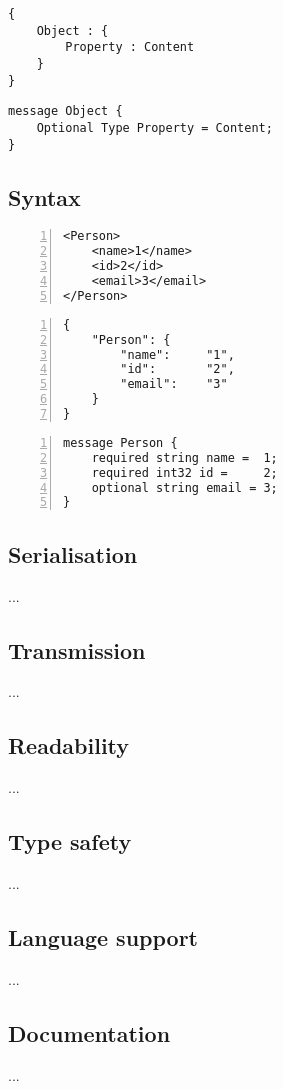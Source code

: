 \documentclass[../report.tex]{subfiles}
\begin{document}
\vspace{1mm}

\begin{Verbatim}[frame=single,numbers=right,framesep=5mm,label=JSON Object]
{
    Object : {
        Property : Content
    }
}
\end{Verbatim}

\vspace{1mm}

\begin{Verbatim}[frame=single,numbers=right,framesep=5mm,label=Proto Object]
message Object {
    Optional Type Property = Content;
}
\end{Verbatim}

\subsection{Syntax}

\begin{Verbatim}[frame=single,numbers=left,framesep=5mm,label=XML Object]
<Person>
    <name>1</name>
    <id>2</id>
    <email>3</email>
</Person>
\end{Verbatim}

\vspace{1mm}

\begin{Verbatim}[frame=single,numbers=left,framesep=5mm,label=JSON Object]
{
    "Person": {
        "name":     "1",
        "id":       "2",
        "email":    "3"
    }
}
\end{Verbatim}

\vspace{1mm}

\begin{Verbatim}[frame=single,numbers=left,framesep=5mm,label=Proto Object]
message Person {
    required string name =  1;
    required int32 id =     2;
    optional string email = 3;
}
\end{Verbatim}

\subsection{Serialisation}

...

\subsection{Transmission}

...

\subsection{Readability}

...

\subsection{Type safety}

...

\subsection{Language support}

...

\subsection{Documentation}

...
\end{document}
